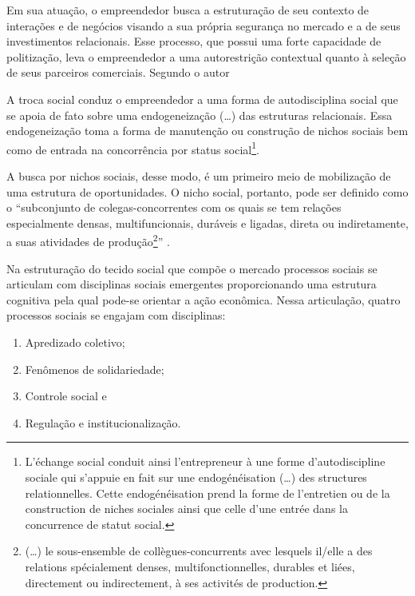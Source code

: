 \documentclass[a4paper, 12pt, openright, oneside, german, french, english, brazil]{abntex2}
\begin{document}
	Em sua atuação, o empreendedor busca a estruturação de seu contexto de interações e de negócios visando a sua própria segurança no mercado e a de seus investimentos relacionais. Esse processo, que possui uma forte capacidade de politização, leva o empreendedor a uma autorestrição contextual quanto à seleção de seus parceiros comerciais. Segundo o autor

	\begin{citacao}
	A troca social conduz o empreendedor a uma forma de autodisciplina social que se apoia de fato sobre uma endogeneização (\dots) das estruturas relacionais. Essa endogeneização toma a forma de manutenção ou construção de nichos sociais bem como de entrada na concorrência por status social\footnote{L'échange social conduit ainsi l'entrepreneur à une forme d'autodiscipline sociale qui s'appuie en fait sur une endogénéisation (\dots) des structures relationnelles. Cette endogénéisation prend la forme de l'entretien ou de la construction de niches sociales ainsi que celle d'une entrée dans la concurrence de statut social.}. \cite[p. 572]{lazega2009theorie}
	\end{citacao}

	A busca por nichos sociais, desse modo, é um primeiro meio de mobilização de uma estrutura de oportunidades. O nicho social, portanto, pode ser definido como o ``subconjunto de colegas-concorrentes com os quais se tem relações especialmente densas, multifuncionais, duráveis e ligadas, direta ou indiretamente, a suas atividades de produção\footnote{(\dots) le sous-ensemble de collègues-concurrents avec lesquels il/elle a des relations spécialement denses, multifonctionnelles, durables et liées, directement ou indirectement, à ses activités de production.}'' \cite[p. 575]{lazega2009theorie}.

	Na estruturação do tecido social que compõe o mercado processos sociais se articulam com disciplinas sociais emergentes proporcionando uma estrutura cognitiva pela qual pode-se orientar a ação econômica. Nessa articulação, quatro processos sociais se engajam com disciplinas:

	\begin{enumerate}
		\item Apredizado coletivo;
		\item Fenômenos de solidariedade;
		\item Controle social e
		\item Regulação e institucionalização.
	\end{enumerate}
\end{document}
